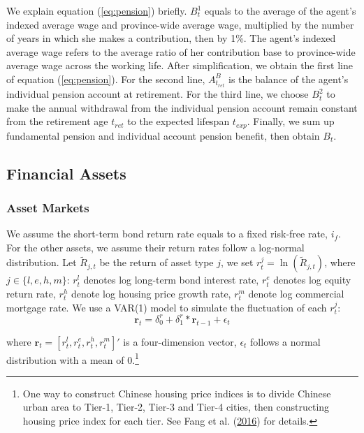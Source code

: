 \documentclass[
  12pt,
]{article}
\begin{document}
We explain equation (\ref{eq:pension}) briefly. \(B^1_t\) equals to the
average of the agent's indexed average wage and province-wide average
wage, multiplied by the number of years in which she makes a
contribution, then by 1\%. The agent's indexed average wage refers to
the average ratio of her contribution base to province-wide average wage
across the working life. After simplification, we obtain the first line
of equation (\ref{eq:pension}). For the second line, \(A^B_{t_{ret}}\)
is the balance of the agent's individual pension account at retirement.
For the third line, we choose \(B^2_t\) to make the annual withdrawal
from the individual pension account remain constant from the retirement
age \(t_{ret}\) to the expected lifespan \(t_{exp}\). Finally, we sum up
fundamental pension and individual account pension benefit, then obtain
\(B_t\).

\hypertarget{financial-assets}{%
\subsection{Financial Assets}\label{financial-assets}}

\hypertarget{asset-markets}{%
\subsubsection{Asset Markets}\label{asset-markets}}

We assume the short-term bond return rate equals to a fixed risk-free
rate, \(i_f\). For the other assets, we assume their return rates follow
a log-normal distribution. Let \(\tilde{R}_{j,t}\) be the return of
asset type \(j\), we set \(r^j_t=\ln(\tilde{R}_{j,t})\), where
\(j\in\{l,e,h,m\}\): \(r^l_t\) denotes log long-term bond interest rate,
\(r^e_t\) denotes log equity return rate, \(r^h_t\) denote log housing
price growth rate, \(r^m_t\) denote log commercial mortgage rate. We use
a VAR(1) model to simulate the fluctuation of each \(r^j_t\):
\begin{equation} 
\textbf{r}_t = \delta^r_0+\delta^r_1* \textbf{r}_{t-1}+\epsilon_t
\end{equation}

where \(\textbf{r}_t =[r^l_t,r^e_t,r^h_t,r^m_t]'\) is a four-dimension
vector, \(\epsilon_t\) follows a normal distribution with a mean of
0.\footnote{One way to construct Chinese housing price indices is to
  divide Chinese urban area to Tier-1, Tier-2, Tier-3 and Tier-4 cities,
  then constructing housing price index for each tier. See Fang et al.
  (\protect\hyperlink{ref-fang_demystifying_2016}{2016}) for details.}
\end{document}
